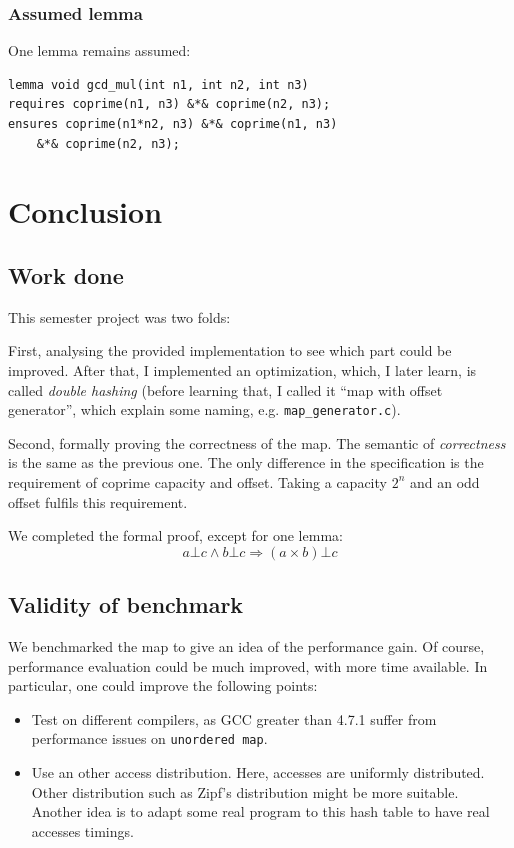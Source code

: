 \documentclass[oneside]{article}
\begin{document}
\subsubsection{Assumed lemma}
One lemma remains assumed: 
\begin{lemma}
	\begin{lstlisting}
lemma void gcd_mul(int n1, int n2, int n3)
requires coprime(n1, n3) &*& coprime(n2, n3);
ensures coprime(n1*n2, n3) &*& coprime(n1, n3) 
	&*& coprime(n2, n3);
	\end{lstlisting}
\end{lemma}


\section{Conclusion}
\subsection{Work done}
This semester project was two folds: 

First, analysing the provided implementation to see which part could be improved. After that, I implemented an optimization, which, I later learn, is called \emph{double hashing} (before learning that, I called it ``map with offset generator'', which explain some naming, e.g. \texttt{map\_generator.c}).

Second, formally proving the correctness of the map. The semantic of \emph{correctness} is the same as the previous one. The only difference in the specification is the requirement of coprime capacity and offset. Taking a capacity $2^n$ and an odd offset fulfils this requirement.

We completed the formal proof, except for one lemma: 
$$a\bot c \wedge b\bot c \Rightarrow (a\times b)\bot c$$
\subsection{Validity of benchmark}
We benchmarked the map to give an idea of the performance gain. Of course, performance evaluation could be much improved, with more time available. In particular, one could improve the following points: 
\begin{itemize}
	\item Test on different compilers, as GCC greater than 4.7.1 suffer from performance issues on \texttt{unordered map}.
	\item Use an other access distribution. Here, accesses are uniformly distributed. Other distribution such as Zipf's distribution might be more suitable. Another idea is to adapt some real program to this hash table to have real accesses timings.
\end{itemize}
\end{document}
